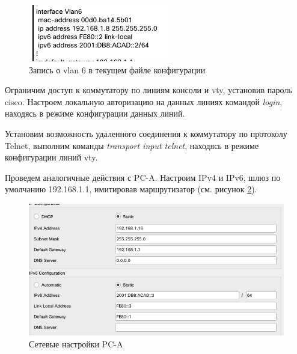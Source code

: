 \documentclass[a4paper,14pt]{extarticle}
\begin{document}
\begin{figure}[h!]
	\centering
	\includegraphics[width=0.6\linewidth]{images/run-conf-vlan}
	\caption{Запись о vlan 6 в текущем файле конфигурации}
	\label{fig:run-conf-vlan}
\end{figure}


Ограничим доступ к коммутатору по линиям консоли и vty, установив пароль cisco. Настроем локальную авторизацию на данных линиях командой \textit{login}, находясь в режиме конфигурации данных линий. 

Установим возможность удаленного соединения к коммутатору по протоколу Telnet, выполним команды \textit{transport input telnet}, находясь в режиме конфигурации линий vty.

{
Проведем аналогичные действия с PC-A. Настроим IPv4 и IPv6, шлюз по умолчанию 192.168.1.1, имитировав маршрутизатор (см. рисунок \ref{fig:pc-a-ip-settings}).

\begin{figure}[h!]
	\centering
	\includegraphics[width=0.6\linewidth]{images/pc-a-ip-settings}
	\caption{Сетевые настройки PC-A}
	\label{fig:pc-a-ip-settings}
\end{figure}
}
\end{document}
